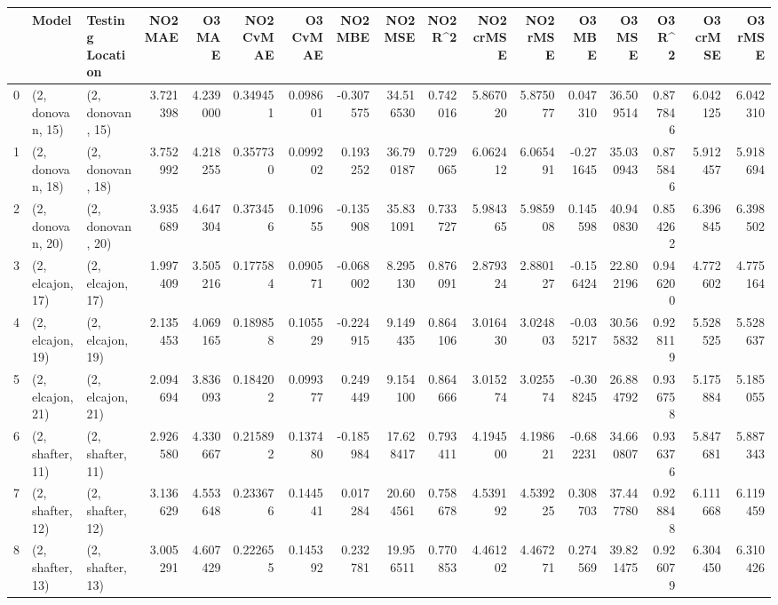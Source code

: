 \begin{tabular}{lllrrrrrrrrrrrrrr}
\toprule
{} &             Model &  Testing Location &   NO2 MAE &    O3 MAE &  NO2 CvMAE &  O3 CvMAE &   NO2 MBE &    NO2 MSE &   NO2 R\textasciicircum2 &  NO2 crMSE &  NO2 rMSE &    O3 MBE &     O3 MSE &    O3 R\textasciicircum2 &  O3 crMSE &   O3 rMSE \\
\midrule
0  &  (2, donovan, 15) &  (2, donovan, 15) &  3.721398 &  4.239000 &   0.349451 &  0.098601 & -0.307575 &  34.516530 &  0.742016 &   5.867020 &  5.875077 &  0.047310 &  36.509514 &  0.877846 &  6.042125 &  6.042310 \\
1  &  (2, donovan, 18) &  (2, donovan, 18) &  3.752992 &  4.218255 &   0.357730 &  0.099202 &  0.193252 &  36.790187 &  0.729065 &   6.062412 &  6.065491 & -0.271645 &  35.030943 &  0.875846 &  5.912457 &  5.918694 \\
2  &  (2, donovan, 20) &  (2, donovan, 20) &  3.935689 &  4.647304 &   0.373456 &  0.109655 & -0.135908 &  35.831091 &  0.733727 &   5.984365 &  5.985908 &  0.145598 &  40.940830 &  0.854262 &  6.396845 &  6.398502 \\
3  &  (2, elcajon, 17) &  (2, elcajon, 17) &  1.997409 &  3.505216 &   0.177584 &  0.090571 & -0.068002 &   8.295130 &  0.876091 &   2.879324 &  2.880127 & -0.156424 &  22.802196 &  0.946200 &  4.772602 &  4.775164 \\
4  &  (2, elcajon, 19) &  (2, elcajon, 19) &  2.135453 &  4.069165 &   0.189858 &  0.105529 & -0.224915 &   9.149435 &  0.864106 &   3.016430 &  3.024803 & -0.035217 &  30.565832 &  0.928119 &  5.528525 &  5.528637 \\
5  &  (2, elcajon, 21) &  (2, elcajon, 21) &  2.094694 &  3.836093 &   0.184202 &  0.099377 &  0.249449 &   9.154100 &  0.864666 &   3.015274 &  3.025574 & -0.308245 &  26.884792 &  0.936758 &  5.175884 &  5.185055 \\
6  &  (2, shafter, 11) &  (2, shafter, 11) &  2.926580 &  4.330667 &   0.215892 &  0.137480 & -0.185984 &  17.628417 &  0.793411 &   4.194500 &  4.198621 & -0.682231 &  34.660807 &  0.936376 &  5.847681 &  5.887343 \\
7  &  (2, shafter, 12) &  (2, shafter, 12) &  3.136629 &  4.553648 &   0.233676 &  0.144541 &  0.017284 &  20.604561 &  0.758678 &   4.539192 &  4.539225 &  0.308703 &  37.447780 &  0.928848 &  6.111668 &  6.119459 \\
8  &  (2, shafter, 13) &  (2, shafter, 13) &  3.005291 &  4.607429 &   0.222655 &  0.145392 &  0.232781 &  19.956511 &  0.770853 &   4.461202 &  4.467271 &  0.274569 &  39.821475 &  0.926079 &  6.304450 &  6.310426 \\

\end{tabular}
